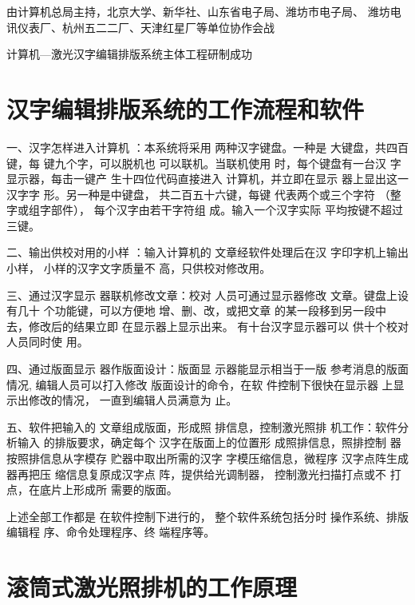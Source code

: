 \documentclass[b5paper]{ctexart}
\begin{document}
\pagestyle{plain}

由计算机总局主持，北京大学、新华社、山东省电子局、潍坊市电子局、
潍坊电讯仪表厂、杭州五二二厂、天津红星厂等单位协作会战

\begin{center}
\LARGE\heiti 计算机—激光汉字编辑排版系统主体工程研制成功
\end{center}

\section*{汉字编辑排版系统的工作流程和软件}

{\heiti 一、汉字怎样进入计算机}
：本系统将采用
两种汉字键盘。一种是
大键盘，共四百键，每
键九个字，可以脱机也
可以联机。当联机使用
时，每个键盘有一台汉
字显示器，每击一键产
生十四位代码直接进入
计算机，并立即在显示
器上显出这一汉字字
形。另一种是中键盘，
共二百五十六键，每键
代表两个或三个字符
（整字或组字部件），
每个汉字由若干字符组
成。输入一个汉字实际
平均按键不超过三键。

{\heiti 二、输出供校对用的小样}
：输入计算机的
文章经软件处理后在汉
字印字机上输出小样，
小样的汉字文字质量不
高，只供校对修改用。

{\heiti 三、通过汉字显示
器联机修改文章}：校对
人员可通过显示器修改
文章。键盘上设有几十
个功能键，可以方便地
增、删、改，或把文章
的某一段移到另一段中
去，修改后的结果立即
在显示器上显示出来。
有十台汉字显示器可以
供十个校对人员同时使
用。

{\heiti 四、通过版面显示
器作版面设计}：版面显
示器能显示相当于一版
参考消息的版面情况,
编辑人员可以打入修改
版面设计的命令，在软
件控制下很快在显示器
上显示出修改的情况，
一直到编辑人员满意为
止。

{\heiti 五、软件把输入的
文章组成版面，形成照
排信息，控制激光照排
机工作}：软件分析输入
的排版要求，确定每个
汉字在版面上的位置形
成照排信息，照排控制
器按照排信息从字模存
贮器中取出所需的汉字
字模压缩信息，微程序
汉字点阵生成器再把压
缩信息复原成汉字点
阵，提供给光调制器，
控制激光扫描打点或不
打点，在底片上形成所
需要的版面。

上述全部工作都是
在软件控制下进行的，
整个软件系统包括分时
操作系统、排版编辑程
序、命令处理程序、终
端程序等。



\section*{\textmd{\heiti 滚筒式激光照排机的工作原理}}
\end{document}
